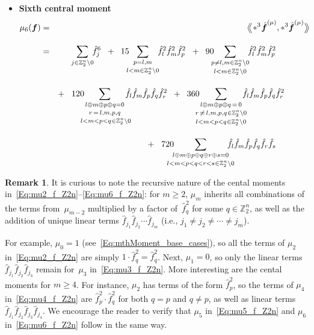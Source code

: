 \documentclass[letterpaper,11pt]{article}
\newcommand{\bs}[1]{{\boldsymbol{#1}}}
\newcommand{\gr}[1]{( #1 )}
\newcommand{\Int}{\mathbb Z}
\newcommand{\conv}{\ast}
\newcommand{\dimin}[2]{{ #1 }^{\gr{#2}}}
\newcommand{\Dotprod}[2]{\big\langle\!\:\!\!\big\langle #1, #2 \big\rangle\!\:\!\!\big\rangle}
\newcommand{\hatbsf}{{\kern+0.25em}\hat{{\kern-0.25em}\bs{f}}}
\theoremstyle{definition} \newtheorem{remark}{Remark}
\begin{document}
\begin{itemize}
\item \textbf{Sixth central moment}
\begin{eqnarray} \label{Eq:mu6_f_Z2n}
\mu_6\gr{\bs{f}} &=&
\Dotprod{\!\conv^3 \!\dimin{\hatbsf}{\mu}}{\conv^3 \dimin{\hatbsf}{\mu}} \nonumber \\[10pt]
&=&
\sum_{j \in \Int_2^n\backslash0} \!\! \hat{f}_j^6
        \;\;+\;\; 15 \!\!\!\sum_{\substack{p = l,m\\[2pt] l<m \in \Int_2^n\backslash0}} \!\! \hat{f}_l^2 \hat{f}_m^2 \hat{f}_p^2
        \;\;+\;\; 90 \!\!\!\sum_{\substack{p \neq l,m \in \Int_2^n\backslash0\\[2pt] l<m \in \Int_2^n\backslash0}} \!\! \hat{f}_l^2 \hat{f}_m^2 \hat{f}_p^2 \qquad\qquad \nonumber \\[10pt]
&&
+\;\;\; 120\!\!\!\!\!\sum_{\substack{l \oplus m \oplus p \oplus q = 0 \\[2pt] \substack{r\,=\,l,m,p,q \\[2pt] \;l<m<p<q \:\!\in \Int_2^n\backslash0}}} \!\!\!\!\! \hat{f}_l \hat{f}_m \hat{f}_p \hat{f}_q \hat{f}_r^2
\;\;+\;\;
360\!\!\!\!\sum_{\substack{l \oplus m \oplus p \oplus q \,=\, 0 \\[2pt] \substack{r\,\neq\,l,m,p,q \:\!\in \Int_2^n\backslash0\\[2pt] l<m<p<q \:\!\in \Int_2^n\backslash0}}} \!\!\!\! \hat{f}_l \hat{f}_m \hat{f}_p \hat{f}_q \hat{f}_r^2 \qquad\quad \nonumber \\[10pt]
&&
\qquad\qquad + \;\;\; 720\!\!\!\!\!\!\sum_{\substack{l \oplus m \oplus p \oplus q \oplus r \oplus s = 0 \\[2pt] l<m<p<q<r<s \:\!\in \Int_2^n\backslash0}} \!\!\!\!\!\! \hat{f}_l \hat{f}_m \hat{f}_p \hat{f}_q \hat{f}_r \hat{f}_s \qquad\qquad
\end{eqnarray}
\end{itemize}

\begin{remark}
It is curious to note the recursive nature of the cental moments in~{\eqref{Eq:mu2_f_Z2n}--\eqref{Eq:mu6_f_Z2n}}: for $m\geq2$, $\mu_m$ inherits all combinations of the terms from~$\mu_{m-2}$ multiplied by a factor of~$\hat{f}_{q}^2$ for some $q\in\Int_2^n$, as well as the addition of unique linear terms $\hat{f}_{j_1} \hat{f}_{j_2} \cdots \hat{f}_{j_m}$ (i.e., $j_1 \neq j_2 \neq \cdots \neq j_m$).

For example, $\mu_0=1$ (see~\eqref{Eq:mthMoment_base_cases}), so all the terms of $\mu_2$ in~\eqref{Eq:mu2_f_Z2n} are simply $1\cdot\hat{f}_{q}^2 = \hat{f}_{q}^2$. Next, $\mu_1=0$, so only the linear terms $\hat{f}_{j_1} \hat{f}_{j_2} \hat{f}_{j_3}$ remain for~$\mu_3$ in~\eqref{Eq:mu3_f_Z2n}. More interesting are the cental moments for $m\geq4$. For instance, $\mu_2$ has terms of the form $\hat{f}_{p}^2$, so the terms of $\mu_4$ in~\eqref{Eq:mu4_f_Z2n} are $\hat{f}_{p}^2 \cdot \hat{f}_{q}^2$ for both $q=p$ and $q \neq p$, as well as linear terms $\hat{f}_{j_1} \hat{f}_{j_2} \hat{f}_{j_3} \hat{f}_{j_4}$. We encourage the reader to verify that $\mu_5$ in~\eqref{Eq:mu5_f_Z2n} and $\mu_6$ in~\eqref{Eq:mu6_f_Z2n} follow in the same way.
\end{remark}
\end{document}
